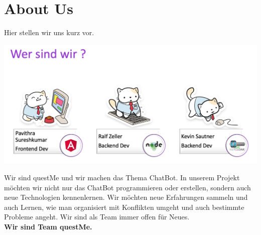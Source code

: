 \section{About Us}
Hier stellen wir uns kurz vor.
\\
\begin{center}
    \includegraphics[width=15cm]{bilder/aboutus/Screen Shot 2021-10-28 at 7.07.17 PM.png}
\end{center} 
    Wir sind questMe und wir machen das Thema ChatBot. In unserem Projekt möchten wir nicht nur
    das ChatBot programmieren oder erstellen, sondern auch neue Technologien kennenlernen.
    Wir möchten neue Erfahrungen sammeln und auch Lernen, wie man organisiert mit 
    Konflikten umgeht und auch bestimmte Probleme angeht.
    Wir sind als Team immer offen für Neues.
\\

\textbf{Wir sind Team questMe.}
